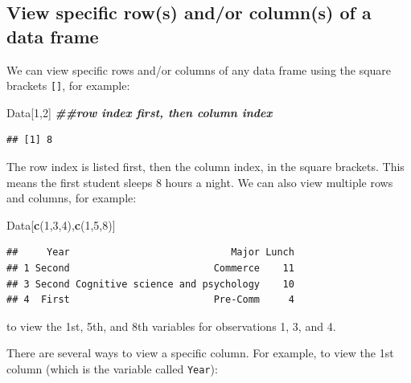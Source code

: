 \documentclass[
]{book}
\newenvironment{Shaded}{\begin{snugshade}}{\end{snugshade}}
\newcommand{\DecValTok}[1]{\textcolor[rgb]{0.00,0.00,0.81}{#1}}
\newcommand{\DocumentationTok}[1]{\textcolor[rgb]{0.56,0.35,0.01}{\textbf{\textit{#1}}}}
\newcommand{\FunctionTok}[1]{\textcolor[rgb]{0.13,0.29,0.53}{\textbf{#1}}}
\newcommand{\NormalTok}[1]{#1}
\newcommand{\SpecialCharTok}[1]{\textcolor[rgb]{0.81,0.36,0.00}{\textbf{#1}}}
\begin{document}
\hypertarget{view-specific-rows-andor-columns-of-a-data-frame}{%
\subsection{View specific row(s) and/or column(s) of a data frame}\label{view-specific-rows-andor-columns-of-a-data-frame}}

We can view specific rows and/or columns of any data frame using the square brackets \texttt{{[}{]}}, for example:

\begin{Shaded}
\begin{Highlighting}[]
\NormalTok{Data[}\DecValTok{1}\NormalTok{,}\DecValTok{2}\NormalTok{] }\DocumentationTok{\#\#row index first, then column index}
\end{Highlighting}
\end{Shaded}

\begin{verbatim}
## [1] 8
\end{verbatim}

The row index is listed first, then the column index, in the square brackets. This means the first student sleeps 8 hours a night. We can also view multiple rows and columns, for example:

\begin{Shaded}
\begin{Highlighting}[]
\NormalTok{Data[}\FunctionTok{c}\NormalTok{(}\DecValTok{1}\NormalTok{,}\DecValTok{3}\NormalTok{,}\DecValTok{4}\NormalTok{),}\FunctionTok{c}\NormalTok{(}\DecValTok{1}\NormalTok{,}\DecValTok{5}\NormalTok{,}\DecValTok{8}\NormalTok{)]}
\end{Highlighting}
\end{Shaded}

\begin{verbatim}
##     Year                            Major Lunch
## 1 Second                         Commerce    11
## 3 Second Cognitive science and psychology    10
## 4  First                         Pre-Comm     4
\end{verbatim}

to view the 1st, 5th, and 8th variables for observations 1, 3, and 4.

There are several ways to view a specific column. For example, to view the 1st column (which is the variable called \texttt{Year}):

\begin{Shaded}
\end{Shaded}
\end{document}
